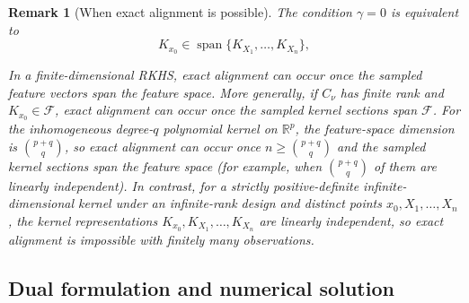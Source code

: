 \documentclass[11pt]{article}
\newtheorem{remark}{Remark}[section]
\newcommand{\R}{\mathbb{R}}
\newcommand{\F}{\mathcal{F}}
\begin{document}
\begin{remark}[When exact alignment is possible]
The condition $\gamma=0$ is equivalent to
\[
  K_{x_0}\in\operatorname{span}\{K_{X_1},\ldots,K_{X_n}\},
\]

In a finite-dimensional RKHS, exact alignment can occur once the sampled feature vectors span the feature space. More generally, if $C_\nu$ has finite rank and $K_{x_0}\in\F$, exact alignment can occur once the sampled kernel sections span $\F$. For the inhomogeneous degree-$q$ polynomial kernel on $\R^p$, the feature-space dimension is $\binom{p+q}{q}$, so exact alignment can occur once $n\geq\binom{p+q}{q}$ and the sampled kernel sections span the feature space (for example, when $\binom{p+q}{q}$ of them are linearly independent). In contrast, for a strictly positive-definite infinite-dimensional kernel under an infinite-rank design and distinct points $x_0,X_1,\ldots,X_n$, the kernel representations $K_{x_0},K_{X_1},\dots,K_{X_n}$ are linearly independent, so exact alignment is impossible with finitely many observations.
\end{remark}

\subsection{Dual formulation and numerical solution}
\end{document}

